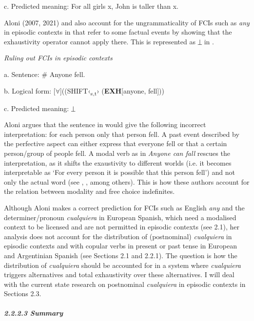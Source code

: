   c.  Predicted meaning: For all girls x, John is taller than x.

    \citep{AloniEtAl2011}

Aloni (2007, 2021) and \citet{AloniEtAl2013} also account for the ungrammaticality of FCIs such as \textit{any} in episodic contexts in  that refer to some factual events by showing that the exhaustivity operator cannot apply there. This is represented as ⏊ in . 

\label{bkm:Ref517204}  \textit{Ruling out FCIs in episodic contexts} 

  a.  Sentence: \# Anyone fell.

  b.  Logical form: [${\forall}$]((\textsc{SHIFT}‹\textsubscript{s,t}› (\textbf{EXH}[anyone, fell]))

  c.  Predicted meaning: ⏊

    \citep{Aloni2021}

Aloni argues that the sentence in  would give the following incorrect interpretation: for each person only that person fell. A past event described by the perfective aspect can either express that everyone fell or that a certain person/group of people fell. A modal verb as in \textit{Anyone can fall} rescues the interpretation, as it shifts the exaustivity to different worlds (i.e. it becomes interpretable as ‘For every person it is possible that this person fell’) and not only the actual word (see \citealt{Menéndez-Benito2010}, \citealt{Aloni2021}, among others). This is how these authors account for the relation between modality and free choice indefinites.

  Although Aloni makes a correct prediction for FCIs such as English \textit{any} and the determiner/pronoun \textit{cualquiera} in European Spanish, which need a modalised context to be licensed and are not permitted in episodic contexts (see 2.1), her analysis does not account for the distribution of (postnominal) \textit{cualquiera} in episodic contexts and with copular verbs in present or past tense in European and Argentinian Spanish (see Sections 2.1 and 2.2.1). The question is how the distribution of \textit{cualquiera} should be accounted for in a system where \textit{cualquiera} triggers alternatives and total exhaustivity over these alternatives. I will deal with the current state research on postnominal \textit{cualquiera} in episodic contexts in Sections 2.3.

\paragraph{\textit{2.2.2.3 Summary}}

